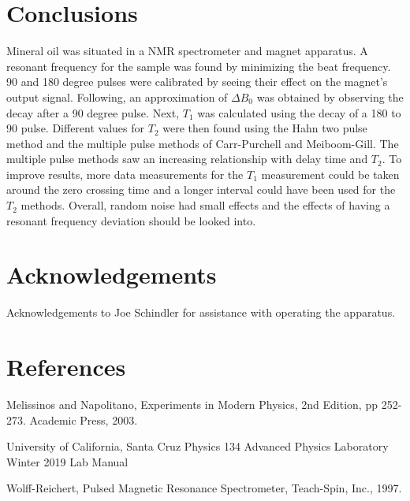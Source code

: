 \documentclass[]{report}
\begin{document}
	
\section{Conclusions}

Mineral oil was situated in a NMR spectrometer and magnet apparatus. A resonant frequency for the sample was found by minimizing the beat frequency. 90 and 180 degree pulses were calibrated by seeing their effect on the magnet's output signal. Following, an approximation of $\Delta B_{0}$ was obtained by observing the decay after a 90 degree pulse. Next, $T_{1}$ was calculated using the decay of a 180 to 90 pulse. Different values for $T_{2}$ were then found using the Hahn two pulse method and the multiple pulse methods of Carr-Purchell and Meiboom-Gill. The multiple pulse methods saw an increasing relationship with delay time and $T_{2}$. To improve results, more data measurements for the $T_{1}$ measurement could be taken around the zero crossing time and a longer interval could have been used for the $T_{2}$ methods. Overall, random noise had small effects and the effects of having a resonant frequency deviation should be looked into. 


\section{Acknowledgements}

Acknowledgements to Joe Schindler for assistance with operating the apparatus.

\section{References}

	Melissinos and Napolitano, Experiments in Modern Physics, 2nd Edition, pp 252-273. Academic Press, 2003.

\smallskip

	University of California, Santa Cruz Physics 134 Advanced Physics Laboratory Winter 2019 Lab Manual

\smallskip

	Wolff-Reichert, Pulsed Magnetic Resonance Spectrometer, Teach-Spin, Inc., 1997.







\end{document}
